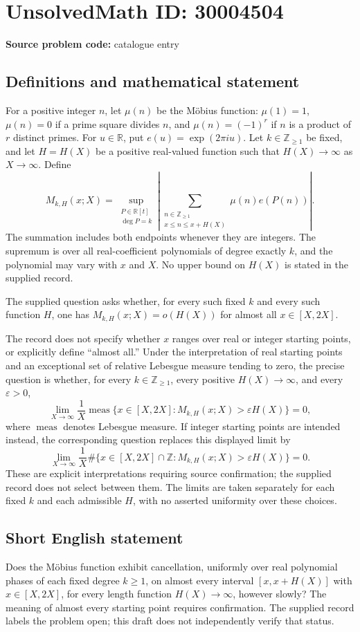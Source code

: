\documentclass[11pt]{article}
\newcommand{\Z}{\mathbb{Z}}
\newcommand{\R}{\mathbb{R}}
\begin{document}
\section*{UnsolvedMath ID: 30004504}
\textbf{Source problem code:} catalogue entry
\subsection{Definitions and mathematical statement}
For a positive integer \(n\), let \(\mu(n)\) be the Möbius function: \(\mu(1)=1\), \(\mu(n)=0\) if a prime square divides \(n\), and \(\mu(n)=(-1)^r\) if \(n\) is a product of \(r\) distinct primes. For \(u\in\R\), put \(e(u)=\exp(2\pi i u)\). Let \(k\in\Z_{\geq1}\) be fixed, and let \(H=H(X)\) be a positive real-valued function such that \(H(X)\to\infty\) as \(X\to\infty\). Define
\[
M_{k,H}(x;X)=\sup_{\substack{P\in\R[t]\\ \deg P=k}}\left|\sum_{\substack{n\in\Z_{\geq1}\\ x\leq n\leq x+H(X)}}\mu(n)e(P(n))\right|.
\]
The summation includes both endpoints whenever they are integers. The supremum is over all real-coefficient polynomials of degree exactly \(k\), and the polynomial may vary with \(x\) and \(X\). No upper bound on \(H(X)\) is stated in the supplied record.

The supplied question asks whether, for every such fixed \(k\) and every such function \(H\), one has \(M_{k,H}(x;X)=o(H(X))\) for almost all \(x\in[X,2X]\).

The record does not specify whether \(x\) ranges over real or integer starting points, or explicitly define ``almost all.'' Under the interpretation of real starting points and an exceptional set of relative Lebesgue measure tending to zero, the precise question is whether, for every \(k\in\Z_{\geq1}\), every positive \(H(X)\to\infty\), and every \(\varepsilon>0\),
\[
\lim_{X\to\infty}\frac{1}{X}\operatorname{meas}\bigl\{x\in[X,2X]:M_{k,H}(x;X)>\varepsilon H(X)\bigr\}=0,
\]
where \(\operatorname{meas}\) denotes Lebesgue measure. If integer starting points are intended instead, the corresponding question replaces this displayed limit by
\[
\lim_{X\to\infty}\frac{1}{X}\#\bigl\{x\in[X,2X]\cap\Z:M_{k,H}(x;X)>\varepsilon H(X)\bigr\}=0.
\]
These are explicit interpretations requiring source confirmation; the supplied record does not select between them. The limits are taken separately for each fixed \(k\) and each admissible \(H\), with no asserted uniformity over these choices.
\subsection{Short English statement}
Does the Möbius function exhibit cancellation, uniformly over real polynomial phases of each fixed degree \(k\geq1\), on almost every interval \([x,x+H(X)]\) with \(x\in[X,2X]\), for every length function \(H(X)\to\infty\), however slowly? The meaning of almost every starting point requires confirmation. The supplied record labels the problem open; this draft does not independently verify that status.
\end{document}
